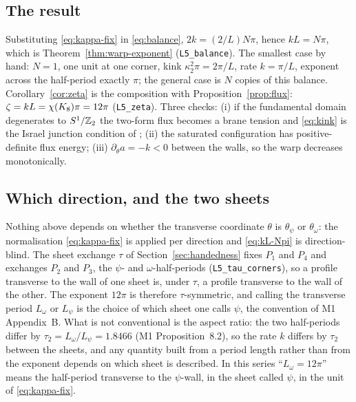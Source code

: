 \subsection{The result}\label{sec:result}

Substituting \eqref{eq:kappa-fix} in \eqref{eq:balance},
$2k=(2/L)N\pi$, hence $kL=N\pi$, which is Theorem~\ref{thm:warp-exponent}
(\texttt{L5\_balance}). The smallest case by hand: $N=1$, one unit at one
corner, kink $\kappa_{2}^{2}\pi=2\pi/L$, rate $k=\pi/L$, exponent across
the half-period exactly $\pi$; the general case is $N$ copies of this
balance. Corollary~\ref{cor:zeta} is the composition with
Proposition~\ref{prop:flux}: $\zeta=kL=\chi(K_8)\pi=12\pi$
(\texttt{L5\_zeta}). Three checks: (i) if the fundamental domain
degenerates to $S^{1}/\mathbb{Z}_2$ the two-form flux becomes a brane tension
and \eqref{eq:kink} is the Israel junction condition of \cite{RS1999};
(ii) the saturated configuration has positive-definite flux energy;
(iii) $\partial_{\theta}a=-k<0$ between the walls, so the warp decreases
monotonically. \rigR

\subsection{Which direction, and the two sheets}\label{sec:direction}

Nothing above depends on whether the transverse coordinate $\theta$ is
$\theta_{\psi}$ or $\theta_{\omega}$: the normalisation \eqref{eq:kappa-fix}
is applied per direction and \eqref{eq:kL-Npi} is direction-blind. The
sheet exchange $\tau$ of Section~\ref{sec:handedness} fixes $P_{1}$ and
$P_{4}$ and exchanges $P_{2}$ and $P_{3}$, the $\psi$- and
$\omega$-half-periods (\texttt{L5\_tau\_corners}), so a profile transverse
to the wall of one sheet is, under $\tau$, a profile transverse to the wall
of the other. The exponent $12\pi$ is therefore $\tau$-symmetric, and
calling the transverse period $L_{\omega}$ or $L_{\psi}$ is the choice of
which sheet one calls $\psi$, the convention of M1 Appendix~B. What is not
conventional is the aspect ratio: the two half-periods differ by
$\tau_{2}=L_{\omega}/L_{\psi}=1.8466$ (M1 Proposition~8.2), so the rate $k$
differs by $\tau_{2}$ between the sheets, and any quantity built from a
period length rather than from the exponent depends on which sheet is
described. In this series ``$L_{\omega}=12\pi$'' means the half-period
transverse to the $\psi$-wall, in the sheet called $\psi$, in the unit of
\eqref{eq:kappa-fix}. \rigD

